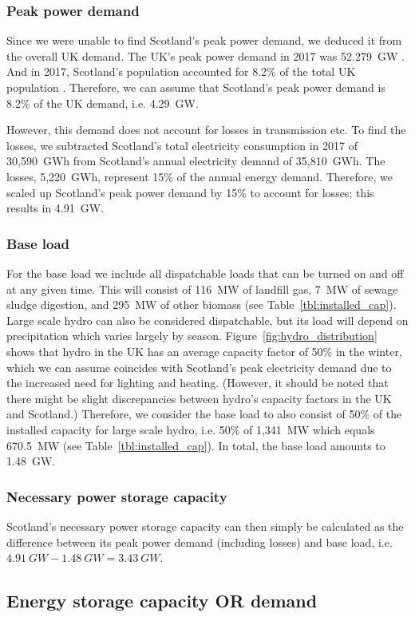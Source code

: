 \subsubsection{Peak power demand}

Since we were unable to find Scotland's peak power demand, we deduced it from the overall UK demand.
The UK's peak power demand in 2017 was 52.279~GW \citep{BEIS2018PeakDemand}.
And in 2017, Scotland's population accounted for 8.2\% of the total UK population \citep{OfficeforNationalStatistics2018}.
Therefore, we can assume that Scotland's peak power demand is 8.2\% of the UK demand, i.e. 4.29~GW.

However, this demand does not account for losses in transmission etc.
To find the losses, we subtracted Scotland's total electricity consumption in 2017 of 30,590~GWh \citep{BEIS2018ElecUK} from Scotland's annual electricity demand of 35,810~GWh.
The losses, 5,220~GWh, represent 15\% of the annual energy demand.
Therefore, we scaled up Scotland's peak power demand by 15\% to account for losses; this results in 4.91~GW.


\subsubsection{Base load}

For the base load we include all dispatchable loads that can be turned on and off at any given time.
This will consist of 116~MW of landfill gas, 7~MW of sewage sludge digestion, and 295~MW of other biomass (see Table~\ref{tbl:installed_cap}).
Large scale hydro can also be considered dispatchable, but its load will depend on precipitation which varies largely by season.
Figure~\ref{fig:hydro_distribution} shows that hydro in the UK has an average capacity factor of 50\% in the winter, which we can assume coincides with Scotland's peak electricity demand due to the increased need for lighting and heating.
(However, it should be noted that there might be slight discrepancies between hydro's capacity factors in the UK and Scotland.)
Therefore, we consider the base load to also consist of 50\% of the installed capacity for large scale hydro, i.e. 50\% of 1,341~MW which equals 670.5~MW (see Table~\ref{tbl:installed_cap}).
In total, the base load amounts to 1.48~GW.




\subsubsection{Necessary power storage capacity}

Scotland's necessary power storage capacity can then simply be calculated as the difference between its peak power demand (including losses) and base load, i.e. $4.91~GW - 1.48~GW = 3.43~GW$.




\subsection{Energy storage capacity OR demand}